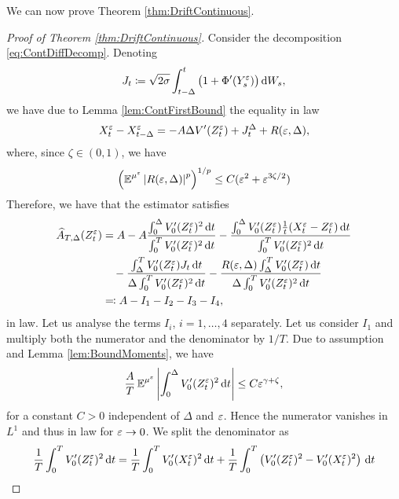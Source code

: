 \documentclass[10pt]{article}
\begin{document}
We can now prove Theorem \ref{thm:DriftContinuous}.
\begin{proof}[Proof of Theorem \ref{thm:DriftContinuous}] Consider the decomposition \eqref{eq:ContDiffDecomp}. Denoting
	\begin{equation}
		J_t \coloneqq \sqrt{2\sigma}\int_{t-\Delta}^t \big(1 + \Phi'(Y^\varepsilon_s)\big) \,\mathrm{d} W_s,
	\end{equation}
	we have due to Lemma \ref{lem:ContFirstBound} the equality in law
	\begin{equation}
		X^\varepsilon_t - X^\varepsilon_{t-\Delta} = -A\Delta V'(Z^\varepsilon_t) + J^\Delta_t + R(\varepsilon, \Delta),
	\end{equation}
	where, since $\zeta \in (0, 1)$, we have
	\begin{equation}
		\left(\operatorname{\mathbb{E}}^{\mu^\varepsilon} \left\lvert R(\varepsilon, \Delta)\right\rvert^p\right)^{1/p} \leq C(\varepsilon^2 + \varepsilon^{3\zeta/2})
	\end{equation}
	Therefore, we have that the estimator satisfies
	\begin{equation}\label{eq:EstDecomp}
	\begin{aligned}
		\widehat A_{T, \Delta}(Z_t^\varepsilon) &= A - A\frac{\int_0^\Delta V_0'(Z^\varepsilon_t)^2 \,\mathrm{d} t}{\int_0^T V_0'(Z^\varepsilon_t)^2 \,\mathrm{d} t} -\frac{\int_0^\Delta V_0'(Z^\varepsilon_t) \frac1t (X^\varepsilon_t - Z^\varepsilon_t) \,\mathrm{d} t}{\int_0^T V_0'(Z^\varepsilon_t)^2 \,\mathrm{d} t} \\
		&\quad - \frac{\int_\Delta^T V_0'(Z^\varepsilon_t) J_t \,\mathrm{d} t}{\Delta \int_0^T V_0'(Z^\varepsilon_t)^2 \,\mathrm{d} t} - \frac{R(\varepsilon, \Delta)\int_\Delta^T V_0'(Z^\varepsilon_t) \,\mathrm{d} t}{\Delta \int_0^T V_0'(Z^\varepsilon_t)^2 \,\mathrm{d} t} \\
		&\eqqcolon A - I_1 - I_2 - I_3 - I_4,
	\end{aligned}
	\end{equation}
	in law. Let us analyse the terms $I_i$, $i = 1, \ldots, 4$ separately. Let us consider $I_1$ and multiply both the numerator and the denominator by $1/T$. Due to assumption  and Lemma \ref{lem:BoundMoments}, we have
	\begin{equation}
		\frac{A}{T}\operatorname{\mathbb{E}}^{\mu^\varepsilon}\left\lvert\int_0^\Delta V_0'(Z^\varepsilon_t)^2 \,\mathrm{d} t\right\rvert \leq C \varepsilon^{\gamma + \zeta},
	\end{equation}
	for a constant $C > 0$ independent of $\Delta$ and $\varepsilon$. Hence the numerator vanishes in $L^1$ and thus in law for $\varepsilon \to 0$. We split the denominator as
	\begin{equation}
		\frac1T \int_0^T V_0'(Z^\varepsilon_t)^2 \,\mathrm{d} t = \frac1T\int_0^T V_0'(X^\varepsilon_t)^2 \,\mathrm{d} t + \frac1T\int_0^T \left(V_0'(Z^\varepsilon_t)^2 - V_0'(X^\varepsilon_t)^2 \right) \,\mathrm{d} t 
	\end{equation} 

\end{proof}
\end{document}
